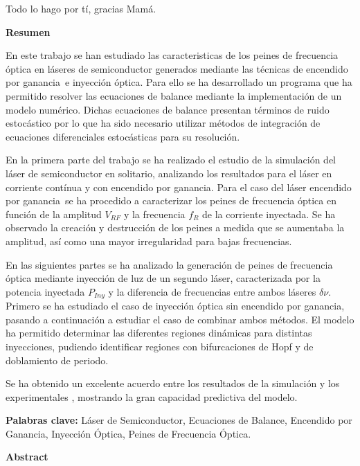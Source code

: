 \documentclass[a4paper, 11pt, oneside]{book}
\newcommand{\gs}{encendido por ganancia}
\begin{document}
				Todo lo hago por tí, gracias Mamá.

			\newpage
			\begin{center}
				\textbf{\centering Resumen}
			\end{center}

				En este trabajo se han estudiado las caracteristicas de los peines de frecuencia \'optica en l\'aseres de semiconductor generados mediante las t\'ecnicas de \gs\ e inyecci\'on \'optica. Para ello se ha desarrollado un programa que ha permitido resolver las ecuaciones de balance mediante la implementaci\'on de un modelo num\'erico. Dichas ecuaciones de balance presentan t\'erminos de ruido estoc\'astico por lo que ha sido necesario utilizar m\'etodos de integraci\'on de ecuaciones diferenciales estoc\'asticas para su resoluci\'on.

				En la primera parte del trabajo se ha realizado el estudio de la simulación del l\'aser de semiconductor en solitario, analizando los resultados para el l\'aser en corriente cont\'inua y con \gs. Para el caso del l\'aser \gs\ se ha procedido a caracterizar los peines de frecuencia \'optica en funci\'on de la amplitud $V_{RF}$ y la frecuencia $f_R$ de la corriente inyectada. Se ha observado la creaci\'on y destrucci\'on de los peines a medida que se aumentaba la amplitud, as\'i como una mayor irregularidad para bajas frecuencias.

				En las siguientes partes se ha analizado la generaci\'on de peines de frecuencia \'optica mediante inyecci\'on de luz de un segundo l\'aser, caracterizada por la potencia inyectada $P_{Iny}$ y la diferencia de frecuencias entre ambos l\'aseres $\delta\nu$. Primero se ha estudiado el caso de inyecci\'on \'optica sin \gs, pasando a continuaci\'on a estudiar el caso de combinar ambos m\'etodos. El modelo ha permitido determinar las diferentes regiones dinámicas para distintas inyecciones, pudiendo identificar regiones con bifurcaciones de Hopf y de doblamiento de periodo.

				Se ha obtenido un excelente acuerdo entre los resultados de la simulación y los experimentales \cite{artSim, Chaves19} , mostrando la gran capacidad predictiva del modelo.
		
			\begin{center}
				\textbf{Palabras clave:} L\'aser de Semiconductor, Ecuaciones de Balance, Encendido por Ganancia, Inyecci\'on \'Optica, Peines de Frecuencia \'Optica.
			\end{center}

		\newpage
			\begin{center}
				\textbf{Abstract}
			\end{center}
\end{document}
